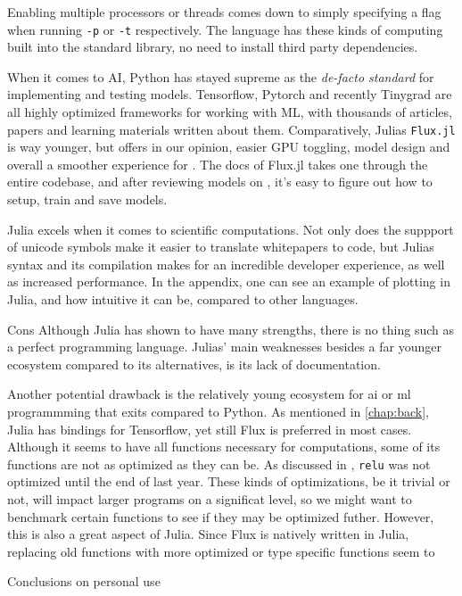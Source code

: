 Enabling multiple processors or threads comes down to simply specifying a flag when running \texttt{-p} or \texttt{-t} respectively. The language has these kinds of computing built into the standard library, no need to install third party dependencies. 

When it comes to AI, Python has stayed supreme as the \textit{de-facto standard} for implementing and testing models. Tensorflow, Pytorch and recently Tinygrad are all highly optimized frameworks for working with ML, with thousands of articles, papers and learning materials written about them. Comparatively, Julias \texttt{Flux.jl} is way younger, but offers in our opinion, easier GPU toggling, model design and overall a smoother experience for . The docs of Flux.jl takes one through the entire codebase, and after reviewing models on \cite{https://github.com/FluxML/model-zoo}, it's easy to figure out how to setup, train and save models.

Julia excels when it comes to scientific computations. Not only does the suppport of unicode symbols make it easier to translate whitepapers to code, but Julias syntax and its compilation makes for an incredible developer experience, as well as increased performance. In the appendix, one can see an example of plotting in Julia, and how intuitive it can be, compared to other languages.






Cons
Although Julia has shown to have many strengths, there is no thing such as a perfect programming language. Julias' main weaknesses besides a far younger ecosystem compared to its alternatives, is its lack of documentation. 

Another potential drawback is the relatively young ecosystem for \acrshort{ai} or \acrshort{ml} programmming that exits compared to Python. As mentioned in \ref{chap:back}, Julia has bindings for Tensorflow, yet still Flux is preferred in most cases. Although it seems to have all functions necessary for computations, some of its functions are not as optimized as they can be. As discussed in \cite{projthesis}, \lstinline|relu| was not optimized until the end of last year. These kinds of optimizations, be it trivial or not, will impact larger programs on a significat level, so we might want to benchmark certain functions to see if they may be optimized futher. However, this is also a great aspect of Julia. Since Flux is natively written in Julia, replacing old functions with more optimized or type specific functions seem to  


Conclusions on personal use 


